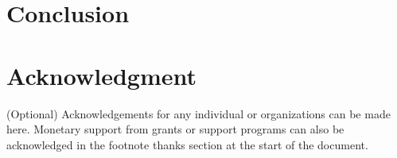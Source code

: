 \documentclass[9pt, compsoc, technote, a4paper]{IEEEtran}
\begin{document}
\section{Conclusion}
\lipsum[1]

\section*{Acknowledgment}
(Optional) Acknowledgements for any individual or organizations can be made here. Monetary support from grants or support programs can also be acknowledged in the footnote thanks section at the start of the document.

\end{document}
